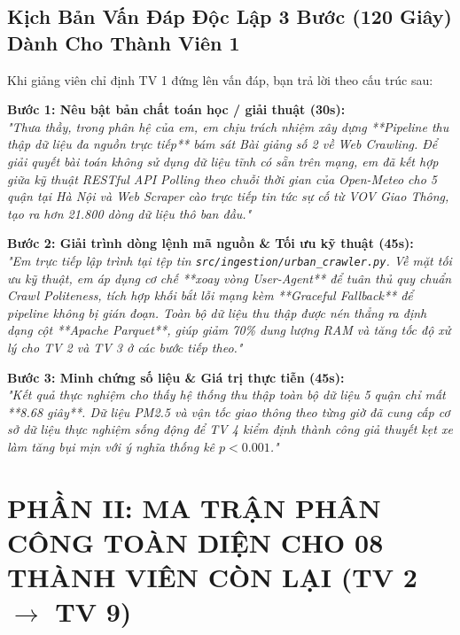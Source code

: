 \documentclass[12pt,a4paper]{article}
\begin{document}
\subsection{Kịch Bản Vấn Đáp Độc Lập 3 Bước (120 Giây) Dành Cho Thành Viên 1}
Khi giảng viên chỉ định TV 1 đứng lên vấn đáp, bạn trả lời theo cấu trúc sau:
\begin{tcolorbox}[colback=gray!5!white, colframe=black, title=\textbf{CHIẾN THUẬT VẤN ĐÁP 120 GIÂY CỦA THÀNH VIÊN 1}]
\textbf{Bước 1: Nêu bật bản chất toán học / giải thuật (30s):}\\
\textit{"Thưa thầy, trong phân hệ của em, em chịu trách nhiệm xây dựng **Pipeline thu thập dữ liệu đa nguồn trực tiếp** bám sát Bài giảng số 2 về Web Crawling. Để giải quyết bài toán không sử dụng dữ liệu tĩnh có sẵn trên mạng, em đã kết hợp giữa kỹ thuật RESTful API Polling theo chuỗi thời gian của Open-Meteo cho 5 quận tại Hà Nội và Web Scraper cào trực tiếp tin tức sự cố từ VOV Giao Thông, tạo ra hơn 21.800 dòng dữ liệu thô ban đầu."}

\vspace{0.2cm}
\textbf{Bước 2: Giải trình dòng lệnh mã nguồn \& Tối ưu kỹ thuật (45s):}\\
\textit{"Em trực tiếp lập trình tại tệp tin \texttt{src/ingestion/urban\_crawler.py}. Về mặt tối ưu kỹ thuật, em áp dụng cơ chế **xoay vòng User-Agent** để tuân thủ quy chuẩn Crawl Politeness, tích hợp khối bắt lỗi mạng kèm **Graceful Fallback** để pipeline không bị gián đoạn. Toàn bộ dữ liệu thu thập được nén thẳng ra định dạng cột **Apache Parquet**, giúp giảm 70\% dung lượng RAM và tăng tốc độ xử lý cho TV 2 và TV 3 ở các bước tiếp theo."}

\vspace{0.2cm}
\textbf{Bước 3: Minh chứng số liệu \& Giá trị thực tiễn (45s):}\\
\textit{"Kết quả thực nghiệm cho thấy hệ thống thu thập toàn bộ dữ liệu 5 quận chỉ mất **8.68 giây**. Dữ liệu PM2.5 và vận tốc giao thông theo từng giờ đã cung cấp cơ sở dữ liệu thực nghiệm sống động để TV 4 kiểm định thành công giả thuyết kẹt xe làm tăng bụi mịn với ý nghĩa thống kê $p < 0.001$."}
\end{tcolorbox}

\newpage

\section{PHẦN II: MA TRẬN PHÂN CÔNG TOÀN DIỆN CHO 08 THÀNH VIÊN CÒN LẠI (TV 2 $\to$ TV 9)}
\end{document}
